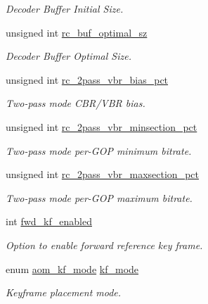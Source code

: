 \begin{DoxyCompactItemize}
\begin{DoxyCompactList}\small\item\em Decoder Buffer Initial Size. \end{DoxyCompactList}\item 
unsigned int \hyperlink{structaom__codec__enc__cfg_aa4d9838419e94e634a02d710da06c842}{rc\+\_\+buf\+\_\+optimal\+\_\+sz}
\begin{DoxyCompactList}\small\item\em Decoder Buffer Optimal Size. \end{DoxyCompactList}\item 
unsigned int \hyperlink{structaom__codec__enc__cfg_a630b9cb2fa79022a7b63cb0bed7e5fcb}{rc\+\_\+2pass\+\_\+vbr\+\_\+bias\+\_\+pct}
\begin{DoxyCompactList}\small\item\em Two-\/pass mode C\+B\+R/\+V\+BR bias. \end{DoxyCompactList}\item 
unsigned int \hyperlink{structaom__codec__enc__cfg_a623802304a377237ec6df7ae31984655}{rc\+\_\+2pass\+\_\+vbr\+\_\+minsection\+\_\+pct}
\begin{DoxyCompactList}\small\item\em Two-\/pass mode per-\/\+G\+OP minimum bitrate. \end{DoxyCompactList}\item 
unsigned int \hyperlink{structaom__codec__enc__cfg_a5610caa642c808af885c1521e916a1e6}{rc\+\_\+2pass\+\_\+vbr\+\_\+maxsection\+\_\+pct}
\begin{DoxyCompactList}\small\item\em Two-\/pass mode per-\/\+G\+OP maximum bitrate. \end{DoxyCompactList}\item 
int \hyperlink{structaom__codec__enc__cfg_aae6716f2cd78979c59f7fa39fec1717f}{fwd\+\_\+kf\+\_\+enabled}
\begin{DoxyCompactList}\small\item\em Option to enable forward reference key frame. \end{DoxyCompactList}\item 
enum \hyperlink{group__encoder_gac0498fc02cd368e6d9675cdb0bab5a84}{aom\+\_\+kf\+\_\+mode} \hyperlink{structaom__codec__enc__cfg_a3c1ea7f3ea90b9b8eab4c3f266ffacdc}{kf\+\_\+mode}
\begin{DoxyCompactList}\small\item\em Keyframe placement mode. \end{DoxyCompactList}\item 

\end{DoxyCompactItemize}

